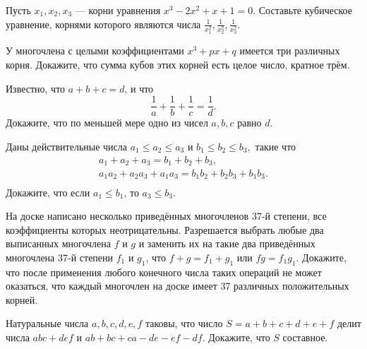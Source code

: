 \documentclass{article}
\begin{document}
    \begin{enumerate_boxed}

        \item Пусть $x_1, x_2, x_3$ — корни уравнения $x^3 - 2x^2 + x + 1 = 0.$
        Составьте кубическое уравнение, корнями которого являются числа $\frac{1}{x_1^2}, \frac{1}{x_2^2}, \frac{1}{x_3^2}$.

        \item У многочлена с целыми коэффициентами $x^3 + px + q$ имеется три различных корня.
        Докажите, что сумма кубов этих корней есть целое число, кратное трём.

        \item Известно, что $a + b + c = d$, и что \[\frac{1}{a} + \frac{1}{b} + \frac{1}{c} = \frac{1}{d}.\]
        Докажите, что по меньшей мере одно из чисел $a, b, c$ равно $d$.

        \item Даны действительные числа $a_1 \leqslant a_2 \leqslant a_3$  и  $b_1 \leqslant b_2 \leqslant b_3,$
        такие что \begin{gather*}
                      a_1 + a_2 + a_3 = b_1 + b_2 + b_3,\\
                      a_{1}a_2 + a_{2}a_3 + a_{1}a_3 = b_{1}b_2 + b_{2}b_3 + b_{1}b_3.\\
        \end{gather*}
        Докажите, что если $a_1 \leq b_1$, то $a_3 \leq b_3$.

        \item На доске написано несколько приведённых многочленов 37-й степени, все коэффициенты которых неотрицательны.
        Разрешается выбрать любые два выписанных многочлена $f$ и $g$ и заменить их на такие два приведённых многочлена 37-й степени $f_1$ и $g_1$, что $f + g = f_1 + g_1$ или $fg = f_{1}g_1$.
        Докажите, что после применения любого конечного числа таких операций не может оказаться, что каждый многочлен на доске имеет 37 различных положительных корней.

        \item Натуральные числа $a, b, c, d, e, f$ таковы, что число $S = a + b + c + d + e + f$ делит
        числа $abc + def$ и  $ab + bc + ca - de - ef - df.$ Докажите, что $S$ составное.


    \end{enumerate_boxed}
\end{document}
